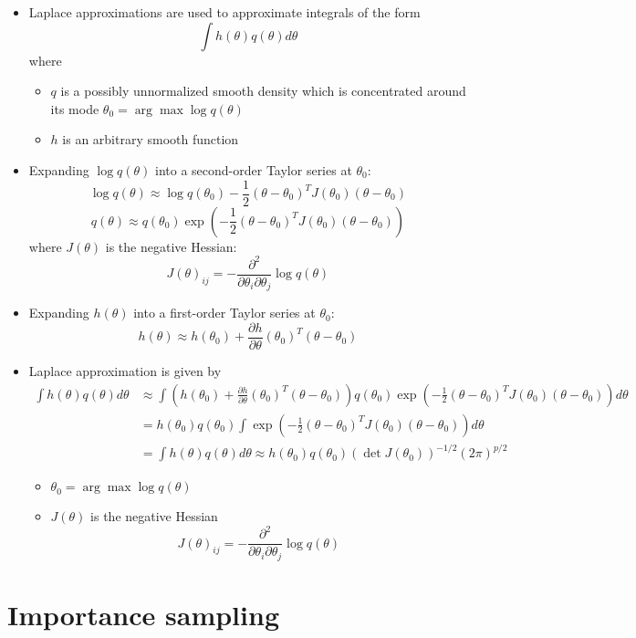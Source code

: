 \documentclass[a4paper]{article}
\begin{document}
\begin{itemize}
    \item Laplace approximations are used to approximate integrals of the form
    \[\int h(\theta)q(\theta)d\theta \]
    where
    \begin{itemize}
        \item $q$ is a possibly unnormalized smooth density which is concentrated around its mode $\theta_0=\arg\max\log q(\theta)$
        \item $h$ is an arbitrary smooth function
    \end{itemize}
    \item Expanding $\log q(\theta)$ into a second-order Taylor series at $\theta_0$:
    \[\log q(\theta)\approx\log q(\theta_0)-\frac{1}{2}(\theta-\theta_0)^TJ(\theta_0)(\theta-\theta_0) \]
    \[q(\theta)\approx q(\theta_0)\exp\left(-\frac{1}{2}(\theta-\theta_0)^TJ(\theta_0)(\theta-\theta_0) \right) \]
    where $J(\theta)$ is the negative Hessian:
    \[J(\theta)_{ij}=-\frac{\partial^2}{\partial\theta_i\partial\theta_j}\log q(\theta) \]
    \item Expanding $h(\theta)$ into a first-order Taylor series at $\theta_0$:
    \[h(\theta)\approx h(\theta_0)+\frac{\partial h}{\partial\theta}(\theta_0)^T(\theta-\theta_0) \]
    \item Laplace approximation is given by
    \begin{align*}
        \int h(\theta)q(\theta)d\theta&\approx
        \int \left(h(\theta_0)+\frac{\partial h}{\partial\theta}(\theta_0)^T(\theta-\theta_0)\right)
        q(\theta_0)\exp\left(-\frac{1}{2}(\theta-\theta_0)^TJ(\theta_0)(\theta-\theta_0) \right)d\theta \\
        &=h(\theta_0)q(\theta_0)\int\exp\left(-\frac{1}{2}(\theta-\theta_0)^TJ(\theta_0)(\theta-\theta_0) \right)d\theta \\
        &=\int h(\theta)q(\theta)d\theta\approx h(\theta_0)q(\theta_0)(\det J(\theta_0))^{-1/2}(2\pi)^{p/2}
    \end{align*}
    \begin{itemize}
        \item $\theta_0=\arg\max \log q(\theta)$
        \item $J(\theta)$ is the negative Hessian
        \[J(\theta)_{ij}=-\frac{\partial^2}{\partial\theta_i\partial\theta_j}\log q(\theta) \]
    \end{itemize}
\end{itemize}

\section*{Importance sampling}
\end{document}
